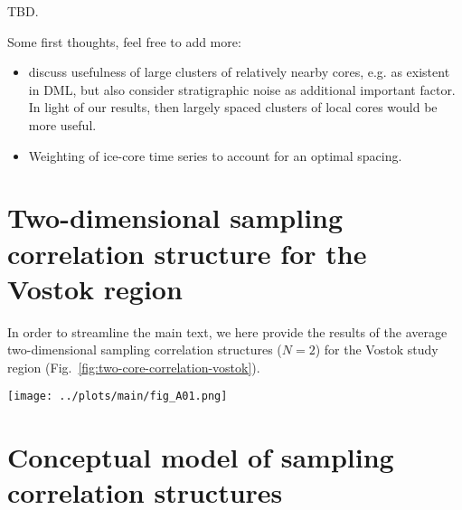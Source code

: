 \documentclass[cp, manuscript, draft]{copernicus}
\begin{document}
TBD.

\noindent Some first thoughts, feel free to add more:
\begin{itemize}
\item discuss usefulness of large clusters of relatively nearby cores, e.g. as
  existent in DML, but also consider stratigraphic noise as additional important
  factor. In light of our results, then largely spaced clusters of local cores
  would be more useful.
\item Weighting of ice-core time series to account for an optimal spacing.
\end{itemize}


\appendix

\section{Two-dimensional sampling correlation structure for the Vostok region}
\label{app:vostok.n2}

In order to streamline the main text, we here provide the results of the
average two-dimensional sampling correlation structures ($N=2$) for the Vostok
study region (Fig.~\ref{fig:two-core-correlation-vostok}).

\begin{figure*}[t]%
\centering
\texttt{[image: ../plots/main/fig\_A01.png]}
\caption{%
  Sampling correlation structures with temperature in the two-dimensional case
  of sampling two locations in the Vostok region. Shown is the mean correlation
  of all possible single correlations from averaging two grid cells of
  (\textbf{a}) $T_{\mathrm{2m}}$, (\textbf{b}) $T_{\mathrm{2m}}^{\mathrm{(pw)}}$
  and (\textbf{c}) $\delta^{18}\mathrm{O}^{\mathrm{(pw)}}$ time series sampled
  from the same or from two different rings, averaged over all target sites in
  the given region. The axes display the distance from the target, where the $x$
  ($y$) axis stands for the first (second) sampled ring and tickmarks
  indicate the radius of the midpoints of the rings. Note that for
  $\delta^{18}\mathrm{O}^{\mathrm{(pw)}}$ the -- albeit marginal -- correlation
  maximum is located for combining the innermost ring with the ring between
  $500$--$750$\,km.}
\label{fig:two-core-correlation-vostok}%
\end{figure*}%

\section{Conceptual model of sampling correlation structures}
\label{app:concept.model}
\end{document}
